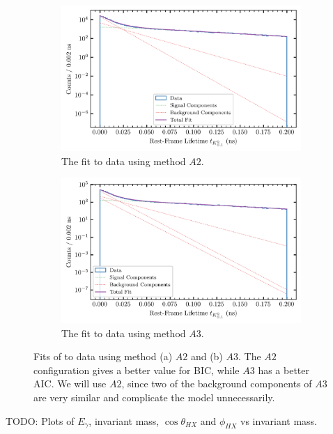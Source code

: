 \begin{figure}
  \begin{center}
    \begin{subfigure}[t]{\textwidth}
        \begin{center}
          \includegraphics[width=.8\columnwidth]{figures/splot_fit_data_chisqdof_3.4_splot_D_1s_2b.png}
        \caption{The fit to data using method $A2$.}
        \end{center}
        \end{subfigure}
        \begin{subfigure}[t]{\textwidth}
          \begin{center}
            \includegraphics[width=.8\columnwidth]{figures/splot_fit_data_chisqdof_3.4_splot_D_1s_3b.png}
        \caption{The fit to data using method $A3$.}
          \end{center}
        \end{subfigure}
        \caption{Fits of  to data using method (a) $A2$ and (b) $A3$. The $A2$ configuration gives a better value for BIC, while $A3$ has a better AIC. We will use $A2$, since two of the background components of $A3$ are very similar and complicate the model unnecessarily.}\label{fig:splot-A2-A3}
\end{center}
\end{figure}
{\color{red}TODO: Plots of $E_\gamma$, invariant mass, $\cos\theta_{HX}$ and $\phi_{HX}$ vs invariant mass.}
